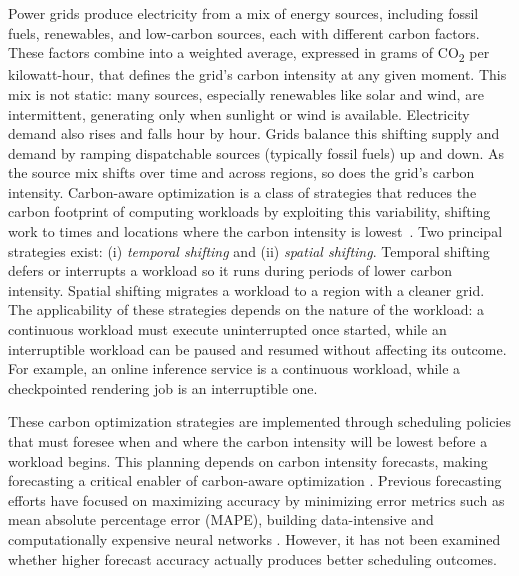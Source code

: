 Power grids produce electricity from a mix of energy sources, including fossil fuels, renewables, and low-carbon sources, each with different carbon factors. 
These factors combine into a weighted average, expressed in grams of CO\textsubscript{2} per kilowatt-hour, that defines the grid's carbon intensity at any given moment.
This mix is not static: many sources, especially renewables like solar and wind, are intermittent, generating only when sunlight or wind is available.
Electricity demand also rises and falls hour by hour.
Grids balance this shifting supply and demand by ramping dispatchable sources (typically fossil fuels) up and down.
As the source mix shifts over time and across regions, so does the grid's carbon intensity.
Carbon-aware optimization is a class of strategies that reduces the carbon footprint of computing workloads by exploiting this variability, shifting work to times and locations where the carbon intensity is lowest~\cite{google_data_center_work_harder,gsteiger_caribou_2024,souza_casper_2023,sukprasert_limitations_2024}. 
Two principal strategies exist: (i) \textit{temporal shifting} and (ii) \textit{spatial shifting}. Temporal shifting defers or interrupts a workload so it runs during periods of lower carbon intensity. Spatial shifting migrates a workload to a region with a cleaner grid.
The applicability of these strategies depends on the nature of the workload: a continuous workload must execute uninterrupted once started, while an interruptible workload can be paused and resumed without affecting its outcome.
For example, an online inference service is a continuous workload, while a checkpointed rendering job is an interruptible one.

These carbon optimization strategies are implemented through scheduling policies that must foresee when and where the carbon intensity will be lowest before a workload begins.
This planning depends on carbon intensity forecasts, making forecasting a critical enabler of carbon-aware optimization \cite{grid_observability}.
Previous forecasting efforts have focused on maximizing accuracy by minimizing error metrics such as mean absolute percentage error (MAPE), building data-intensive and computationally expensive neural networks \cite{maji_carboncast_2022,yan_ensembleci_2025,zhang_gnn-based_2023}.
However, it has not been examined whether higher forecast accuracy actually produces better scheduling outcomes.

